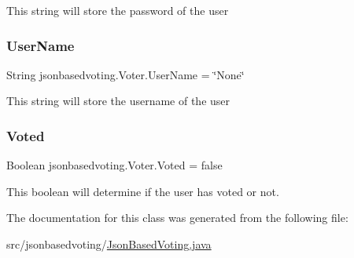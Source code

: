 This string will store the password of the user \mbox{\label{classjsonbasedvoting_1_1_voter_aafea9e9cee8979d334f367a2055d1923}} 
\subsubsection{\texorpdfstring{UserName}{UserName}}
{\footnotesize\ttfamily String jsonbasedvoting.\+Voter.\+User\+Name = \char`\"{}None\char`\"{}\hspace{0.3cm}{\ttfamily [package]}}

This string will store the username of the user \mbox{\label{classjsonbasedvoting_1_1_voter_a502c74b06ceaadb7eddcbbdc01ffd9b9}} 
\subsubsection{\texorpdfstring{Voted}{Voted}}
{\footnotesize\ttfamily Boolean jsonbasedvoting.\+Voter.\+Voted = false\hspace{0.3cm}{\ttfamily [package]}}

This boolean will determine if the user has voted or not. 

The documentation for this class was generated from the following file\+:\begin{DoxyCompactItemize}
\item 
src/jsonbasedvoting/\mbox{\hyperlink{_json_based_voting_8java}{Json\+Based\+Voting.\+java}}\end{DoxyCompactItemize}
